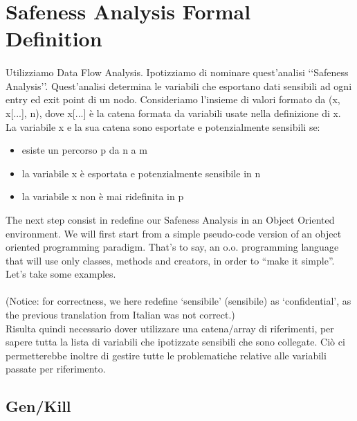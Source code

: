 \documentclass[letterpaper,twocolumn,10pt]{article}
\begin{document}

\section{Safeness Analysis Formal Definition}
\paragraph{}
Utilizziamo Data Flow Analysis. Ipotizziamo di nominare quest'analisi \lq\lq Safeness Analysis\rq\rq. Quest'analisi determina le variabili che esportano dati sensibili ad ogni entry ed exit point di un nodo. Consideriamo l'insieme di valori formato da (x, x[...], n), dove x[...] \`e la catena formata da variabili usate nella definizione di x. La variabile x e la sua catena sono esportate e potenzialmente sensibili se:
\begin{itemize}
\item esiste un percorso p da n a m
\item la variabile x \`e esportata e potenzialmente sensibile in n
\item la variabile x non \`e mai ridefinita in p
\end{itemize}

The next step consist in redefine our Safeness Analysis in an Object Oriented environment. We will first start from a simple pseudo-code version of an object oriented programming paradigm. That's to say, an o.o. programming language that will use only classes, methods and creators, in order to ``make it simple''. Let's take some examples.\\ \\
(Notice: for correctness, we here redefine `sensibile' (sensibile) as `confidential', as the previous translation from Italian was not correct.)\\

Risulta quindi necessario dover utilizzare una catena/array di riferimenti, per sapere tutta la lista di variabili che ipotizzate sensibili che sono collegate. Ci\`o ci permetterebbe inoltre di gestire tutte le problematiche relative alle variabili passate per riferimento.\\

\subsection{Gen/Kill}
\end{document}
